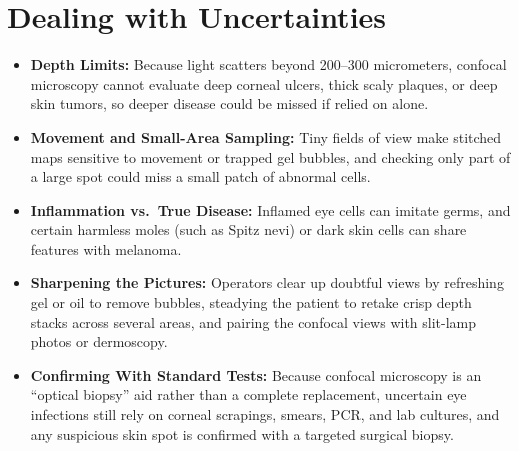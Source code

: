 \section{Dealing with Uncertainties}
\begin{itemize}
    \item \textbf{Depth Limits:} Because light scatters beyond 200--300 micrometers, confocal microscopy cannot evaluate deep corneal ulcers, thick scaly plaques, or deep skin tumors, so deeper disease could be missed if relied on alone.
    \item \textbf{Movement and Small-Area Sampling:} Tiny fields of view make stitched maps sensitive to movement or trapped gel bubbles, and checking only part of a large spot could miss a small patch of abnormal cells.
    \item \textbf{Inflammation vs.\ True Disease:} Inflamed eye cells can imitate germs, and certain harmless moles (such as Spitz nevi) or dark skin cells can share features with melanoma.
    \item \textbf{Sharpening the Pictures:} Operators clear up doubtful views by refreshing gel or oil to remove bubbles, steadying the patient to retake crisp depth stacks across several areas, and pairing the confocal views with slit-lamp photos or dermoscopy.
    \item \textbf{Confirming With Standard Tests:} Because confocal microscopy is an ``optical biopsy'' aid rather than a complete replacement, uncertain eye infections still rely on corneal scrapings, smears, PCR, and lab cultures, and any suspicious skin spot is confirmed with a targeted surgical biopsy.
\end{itemize}

